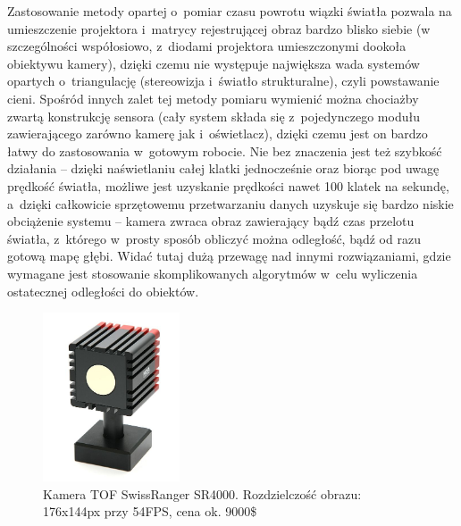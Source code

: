 Zastosowanie metody opartej o~pomiar czasu powrotu wiązki światła pozwala na
umieszczenie projektora i~matrycy rejestrującej obraz bardzo blisko siebie (w
szczególności współosiowo, z~diodami projektora umieszczonymi dookoła obiektywu
kamery), dzięki czemu nie występuje największa wada systemów opartych 
o~triangulację (stereowizja i~światło strukturalne), czyli powstawanie cieni.
Spośród innych zalet tej metody pomiaru wymienić można chociażby zwartą
konstrukcję sensora (cały system składa się z~pojedynczego modułu zawierającego
zarówno kamerę jak i~oświetlacz), dzięki czemu jest on bardzo łatwy do
zastosowania w~gotowym robocie. Nie bez znaczenia jest też szybkość działania --
dzięki naświetlaniu całej klatki jednocześnie oraz biorąc pod uwagę prędkość
światła, możliwe jest uzyskanie prędkości nawet 100 klatek na sekundę, a~dzięki
całkowicie sprzętowemu przetwarzaniu danych uzyskuje się bardzo niskie
obciążenie systemu -- kamera zwraca obraz zawierający bądź czas przelotu
światła, z~którego w~prosty sposób obliczyć można odległość, bądź od razu gotową
mapę głębi. Widać tutaj dużą przewagę nad innymi rozwiązaniami, gdzie wymagane
jest stosowanie skomplikowanych algorytmów w~celu wyliczenia ostatecznej
odległości do obiektów.

\begin{figure}[h!]
\centering
\includegraphics[height=5cm]{../../Common/img/sr4000}
\caption[Kamera TOF SwissRanger SR4000]{Kamera TOF SwissRanger SR4000.
Rozdzielczość obrazu: 176x144px przy 54FPS, cena ok. 9000\$}
\label{fig:sr4000}
\end{figure}

